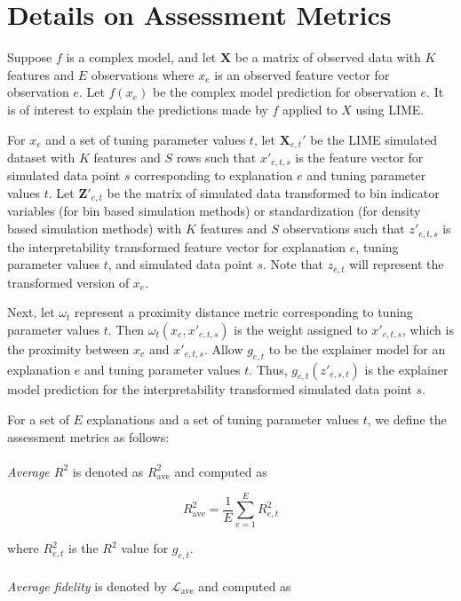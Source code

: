 \documentclass[AMS,STIX2COL]{WileyNJD-v2}\usepackage[]{graphicx}\usepackage[]{color}
\begin{document}
\section{Details on Assessment Metrics} \label{metric-details}

Suppose $f$ is a complex model, and let $\textbf{X}$ be a matrix of observed data with $K$ features and $E$ observations where $x_e$ is an observed feature vector for observation $e$. Let $f(x_e)$ be the complex model prediction for observation $e$. It is of interest to explain the predictions made by $f$ applied to $X$ using LIME. 

For $x_e$ and a set of tuning parameter values $t$, let $\textbf{X}_{e,t}'$ be the LIME simulated dataset with $K$ features and $S$ rows such that $x'_{e,t,s}$ is the feature vector for simulated data point $s$ corresponding to explanation $e$ and tuning parameter values $t$. Let $\textbf{Z}'_{e,t}$ be the matrix of simulated data transformed to bin indicator variables (for bin based simulation methods) or standardization (for density based simulation methods) with $K$ features and $S$ observations such that $z'_{e,t,s}$ is the interpretability transformed feature vector for explanation $e$, tuning parameter values $t$, and simulated data point $s$. Note that $z_{e,t}$ will represent the  transformed version of $x_e$.

Next, let $\omega_t$ represent a proximity distance metric corresponding to tuning parameter values $t$. Then $\omega_t\left(x_e, x'_{e,t,s}\right)$ is the weight assigned to $x'_{e,t,s}$, which is the proximity between $x_e$ and $x'_{e,t,s}$. Allow $g_{e,t}$ to be the explainer model for an explanation $e$ and tuning parameter values $t$. Thus, $g_{e,t}\left(z'_{e,s,t}\right)$ is the explainer model prediction for the interpretability transformed simulated data point $s$. 

For a set of $E$ explanations and a set of tuning parameter values $t$, we define the assessment metrics as follows:\\
\\
\emph{Average $R^2$} is denoted as $R^2_{\mbox{ave}}$ and computed as

  $$R^2_{\mbox{ave}} = \frac{1}{E}\sum_{e=1}^E R_{e,t}^2$$

\noindent where $R_{e,t}^2$ is the $R^2$ value for $g_{e,t}$.\\
\\
\emph{Average fidelity} is denoted by $\mathcal{L}_{\mbox{ave}}$ and computed as
\end{document}
